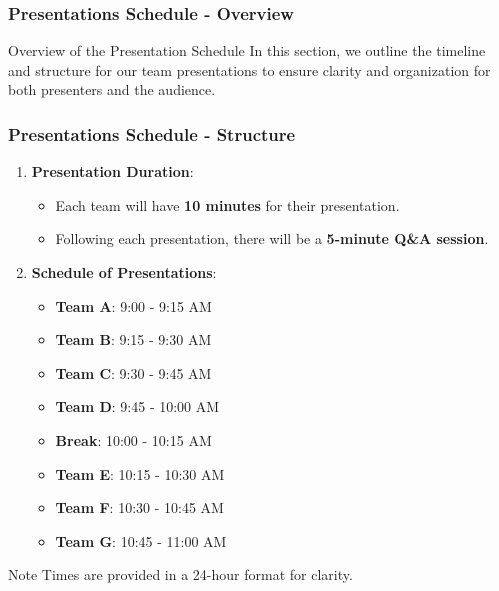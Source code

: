 \documentclass[aspectratio=169]{beamer}
\begin{document}
\begin{frame}[fragile]
    \frametitle{Presentations Schedule - Overview}
    \begin{block}{Overview of the Presentation Schedule}
        In this section, we outline the timeline and structure for our team presentations to ensure clarity and organization for both presenters and the audience.
    \end{block}
\end{frame}

\begin{frame}[fragile]
    \frametitle{Presentations Schedule - Structure}
    \begin{enumerate}
        \item \textbf{Presentation Duration}:
        \begin{itemize}
            \item Each team will have \textbf{10 minutes} for their presentation.
            \item Following each presentation, there will be a \textbf{5-minute Q\&A session}.
        \end{itemize}
        
        \item \textbf{Schedule of Presentations}:
        \begin{itemize}
            \item \textbf{Team A}: 9:00 - 9:15 AM
            \item \textbf{Team B}: 9:15 - 9:30 AM
            \item \textbf{Team C}: 9:30 - 9:45 AM
            \item \textbf{Team D}: 9:45 - 10:00 AM
            \item \textbf{Break}: 10:00 - 10:15 AM
            \item \textbf{Team E}: 10:15 - 10:30 AM
            \item \textbf{Team F}: 10:30 - 10:45 AM
            \item \textbf{Team G}: 10:45 - 11:00 AM
        \end{itemize}
    \end{enumerate}
    \begin{block}{Note}
        Times are provided in a 24-hour format for clarity.
    \end{block}
\end{frame}
\end{document}
